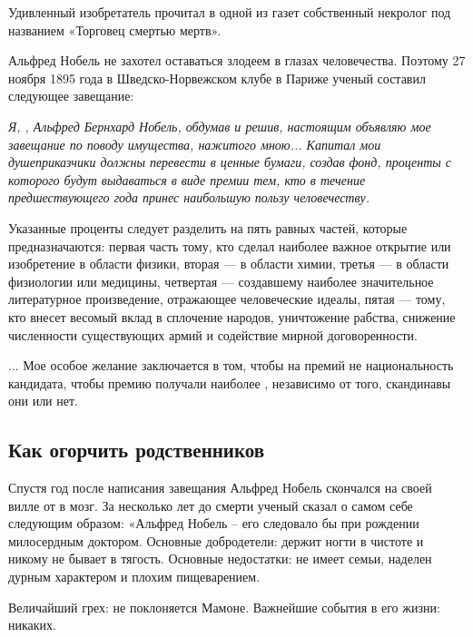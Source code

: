 \begin{fancyquotes}
    Удивленный изобретатель прочитал в одной из газет собственный некролог под названием «Торговец смертью мертв».
\end{fancyquotes}

Альфред Нобель не захотел оставаться злодеем в глазах человечества. Поэтому 27 ноября 1895 года в Шведско-Норвежском клубе в Париже ученый составил следующее завещание:

{\it
Я, , Альфред Бернхард Нобель, обдумав и решив, настоящим объявляю мое завещание по поводу имущества, нажитого мною... Капитал мои душеприказчики должны перевести в ценные бумаги, создав фонд, проценты с которого будут выдаваться в виде премии тем, кто в течение предшествующего года принес наибольшую пользу человечеству.

Указанные проценты следует разделить на пять равных частей, которые предназначаются: первая часть тому, кто сделал наиболее важное открытие или изобретение в области физики, вторая — в области химии, третья — в области физиологии или медицины, четвертая — создавшему наиболее значительное литературное произведение, отражающее человеческие идеалы, пятая — тому, кто внесет весомый вклад в сплочение народов, уничтожение рабства, снижение численности существующих армий и содействие мирной договоренности.

... Мое особое желание заключается в том, чтобы на  премий не  национальность кандидата, чтобы премию получали наиболее , независимо от того, скандинавы они или нет.}

\subsection{Как огорчить родственников}
Спустя год после написания завещания Альфред Нобель скончался на своей вилле от  в мозг. За несколько лет до смерти ученый сказал о самом себе следующим образом: «Альфред Нобель -- его  следовало бы  при рождении милосердным доктором. Основные добродетели: держит ногти в чистоте и никому не бывает в тягость. Основные недостатки: не имеет семьи, наделен дурным характером и плохим пищеварением.

\begin{fancyquotes}
    Величайший грех: не поклоняется Мамоне. Важнейшие события в его жизни: никаких.
\end{fancyquotes}

